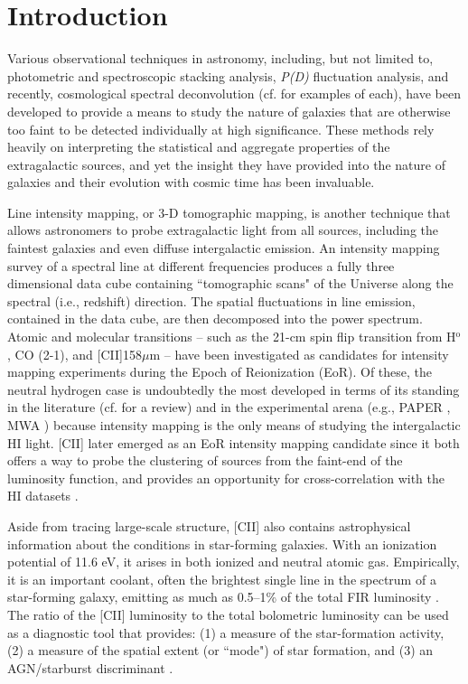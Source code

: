 \documentclass[iop]{emulateapj}
\begin{document}
\section{Introduction}

Various observational techniques in astronomy, including, but not limited to, photometric and spectroscopic stacking analysis, \emph{P(D)} fluctuation analysis, and recently, cosmological spectral deconvolution (cf. \citet{dole2006, glenn10,deputter14} for examples of each), have been developed to provide a means to study the nature of galaxies that are otherwise too faint to be detected individually at high significance. These methods rely heavily on interpreting the statistical and aggregate properties of the extragalactic sources, and yet the insight they have provided into the nature of galaxies and their evolution with cosmic time has been invaluable. 

Line intensity mapping, or 3-D tomographic mapping, is another technique that allows astronomers to probe extragalactic light from all sources, including the faintest galaxies and even diffuse intergalactic emission. An intensity mapping survey of a spectral line at different frequencies produces a fully three dimensional data cube containing ``tomographic scans" of the Universe along the spectral (i.e., redshift) direction. The spatial fluctuations in line emission, contained in the data cube, are then decomposed into the power spectrum. Atomic \citep{gongcii,visbal11} and molecular \citep{lidz11,gong11co} transitions -- such as the 21-cm spin flip transition from H$^{\mathrm{o}}$, CO (2-1), and [CII]158$\mu$m -- have been investigated as candidates for intensity mapping experiments during the Epoch of Reionization (EoR). Of these, the neutral hydrogen case is undoubtedly the most developed in terms of its standing in the literature (cf. \citet{morales10rev} for a review) and in the experimental arena (e.g., PAPER \citep{parsons14}, MWA \citep{tingay13}) because intensity mapping is the only means of studying the intergalactic HI light. [CII] later emerged as an EoR intensity mapping candidate since it both offers a way to probe the clustering of sources from the faint-end of the luminosity function, and provides an opportunity for cross-correlation with the HI datasets \citep{gongcii}.

Aside from tracing large-scale structure, [CII] also contains astrophysical information about the conditions in star-forming galaxies. With an ionization potential of 11.6 eV, it arises in both ionized and neutral atomic gas.  Empirically, it is an important coolant, often the brightest single line in the spectrum of a star-forming galaxy, emitting as much as 0.5--1\% of the total FIR luminosity \citep{malhotra97,luhman98,stacey10,graciacarpio11}.   The ratio of the [CII] luminosity to the total bolometric luminosity can be used as a diagnostic tool that provides: (1) a measure of the star-formation activity, (2) a measure of the spatial extent (or ``mode") of star formation, and (3) an AGN/starburst discriminant \citep{hailey-dunsheath10,stacey10,graciacarpio11,sargsyan12,diaz-santos13}.
\end{document}
